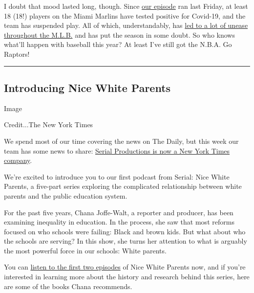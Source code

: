 I doubt that mood lasted long, though. Since
\href{https://www.nytimes3xbfgragh.onion/2020/07/24/podcasts/the-daily/mlb-baseball-season-coronavirus.html?action=click\&module=audio-series-bar\&region=header\&pgtype=Article}{our
episode} ran last Friday, at least 18 (18!) players on the Miami Marlins
have tested positive for Covid-19, and the team has suspended play. All
of which, understandably, has
\href{https://www.nytimes3xbfgragh.onion/2020/07/28/sports/baseball/marlins-outbreak-mlb-coronavirus.html}{led
to a lot of unease throughout the M.L.B.} and has put the season in some
doubt. So who knows what'll happen with baseball this year? At least
I've still got the N.B.A. Go Raptors!

\begin{center}\rule{0.5\linewidth}{\linethickness}\end{center}

\hypertarget{introducing-nice-white-parents}{%
\subsection{Introducing Nice White
Parents}\label{introducing-nice-white-parents}}

Image

Credit...The New York Times

We spend most of our time covering the news on The Daily, but this week
our team has some news to share:
\href{https://www.nytimes3xbfgragh.onion/2020/07/22/business/media/new-york-times-serial.html}{Serial
Productions is now a New York Times company}.

We're excited to introduce you to our first podcast from Serial: Nice
White Parents, a five-part series exploring the complicated relationship
between white parents and the public education system.

For the past five years, Chana Joffe-Walt, a reporter and producer, has
been examining inequality in education. In the process, she saw that
most reforms focused on who schools were failing: Black and brown kids.
But what about who the schools are serving? In this show, she turns her
attention to what is arguably the most powerful force in our schools:
White parents.

You can
\href{https://www.nytimes3xbfgragh.onion/2020/07/30/podcasts/nice-white-parents-serial.html}{listen
to the first two episodes} of Nice White Parents now, and if you're
interested in learning more about the history and research behind this
series, here are some of the books Chana recommends.

